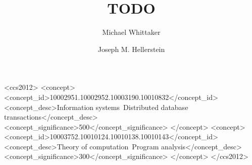 \documentclass[sigconf, review, timestamp]{acmart}
\begin{document}
\title{TODO}

\author{Michael Whittaker}

\author{Joseph M. Hellerstein}

{}

\begin{CCSXML}
<ccs2012>
<concept>
<concept_id>10002951.10002952.10003190.10010832</concept_id>
<concept_desc>Information systems~Distributed database transactions</concept_desc>
<concept_significance>500</concept_significance>
</concept>
<concept>
<concept_id>10003752.10010124.10010138.10010143</concept_id>
<concept_desc>Theory of computation~Program analysis</concept_desc>
<concept_significance>300</concept_significance>
</concept>
</ccs2012>
\end{CCSXML}

\maketitle
{}
{}
{}
{}
{}
{}
{}
{}
{}
{}


\end{document}
